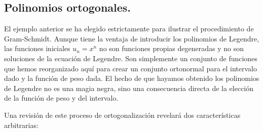 \subsection{Polinomios ortogonales.}
El ejemplo anterior se ha elegido estrictamente para ilustrar el procedimiento de Gram-Schmidt. Aunque tiene la ventaja de introducir los polinomios de Legendre, las funciones iniciales $u_{n} = x^{n}$ no son funciones propias degeneradas y no son soluciones de la ecuación de Legendre. Son simplemente un conjunto de funciones que hemos reorganizado aquí para crear un conjunto ortonormal para el intervalo dado y la función de peso dada. El hecho de que hayamos obtenido los polinomios de Legendre no es una magia negra, sino una consecuencia directa de la elección de la función de peso y del intervalo.
\par
\begin{table}[H]
\caption{Polinomios ortogonales generados por la ortogonalización de Gram-Schmidt de $u_{n}(x)= x^{n}$, con $n=0,1,2,\ldots$}
\end{table}
Una revisión de este proceso de ortogonalización revelará dos características arbitrarias:
